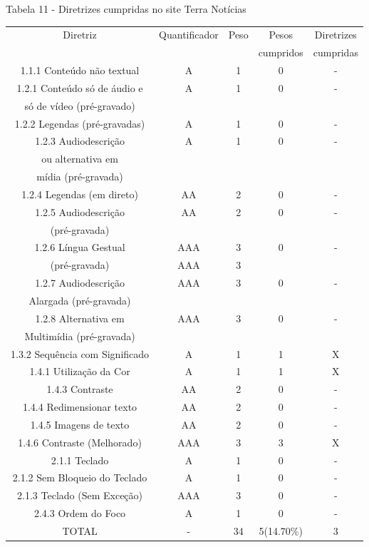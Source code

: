 \documentclass[a4paper]{article}
\begin{document}
\begin{titlepage}
Tabela 11 - Diretrizes cumpridas no site Terra Notícias\\[-1cm]
\begin{center}
	\fontsize{8pt}{8pt}\selectfont	
	\begin{longtable}{|c|c|c|c|c|}
		\hline
		Diretriz & Quantificador & Peso & Pesos & Diretrizes\\
		& & & cumpridos & cumpridas\\
		\hline
		1.1.1 Conteúdo não textual & A & 1 & 0 & - \\
		\hline
		1.2.1 Conteúdo só de áudio e & A & 1 & 0 & - \\
		só de vídeo (pré-gravado) & & & & \\
		\hline
		1.2.2 Legendas (pré-gravadas) & A & 1 & 0 & - \\
		\hline
		1.2.3 Audiodescrição & A & 1 & 0 & - \\
		ou alternativa em & & & & \\
		mídia (pré-gravada) & & & & \\
		\hline
		1.2.4 Legendas (em direto) & AA & 2 & 0 & - \\
		\hline
		1.2.5 Audiodescrição & AA & 2 & 0 & - \\
		(pré-gravada) & & & & \\
		\hline
		1.2.6 Língua Gestual & AAA & 3 & 0 & - \\
		(pré-gravada) & AAA & 3 & & \\
		\hline
		1.2.7 Audiodescrição & AAA & 3 & 0 & - \\
		Alargada (pré-gravada) & & & & \\
		\hline
		1.2.8 Alternativa em & AAA & 3 & 0 & - \\
		Multimídia (pré-gravada) & & & & \\
		\hline
		1.3.2 Sequência com Significado & A & 1 & 1 & X \\
		\hline
		1.4.1 Utilização da Cor & A & 1 & 1 & X \\
		\hline
		1.4.3 Contraste & AA & 2 & 0 & - \\
		\hline
		1.4.4 Redimensionar texto & AA & 2 & 0 & - \\
		\hline
		1.4.5 Imagens de texto & AA & 2 & 0 & - \\
		\hline
		1.4.6 Contraste (Melhorado) & AAA & 3 & 3 & X \\
		\hline
		2.1.1 Teclado & A & 1 & 0 & - \\
		\hline
		2.1.2 Sem Bloqueio do Teclado & A & 1 & 0 & - \\
		\hline
		2.1.3 Teclado (Sem Exceção) & AAA & 3 & 0 & - \\
		\hline
		2.4.3 Ordem do Foco & A & 1 & 0 & - \\
		\hline
		TOTAL & - & 34 & 5(14.70\%) & 3 \\
		\hline
	\end{longtable}
\end{center}


\end{titlepage}
\end{document}
